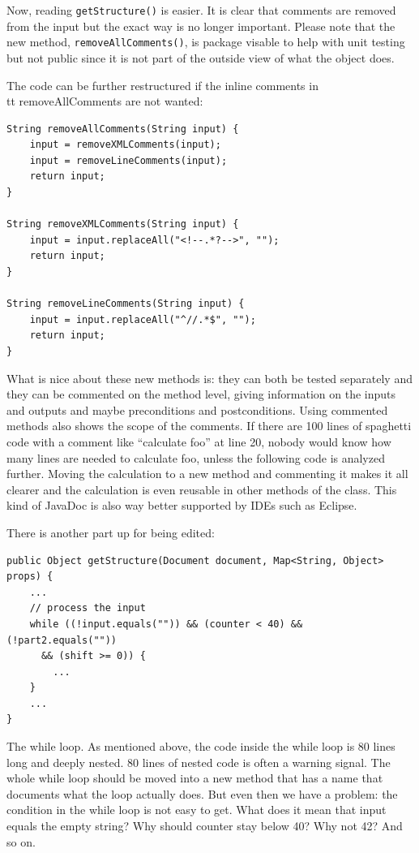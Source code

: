 \documentclass[12pt]{book}
\begin{document}
Now, reading {\tt getStructure()} is easier. It is clear that comments are removed from the input but the exact way is no longer important. Please note that the new method, {\tt removeAllComments()}, is package visable to help with unit testing but not public since it is not part of the outside view of what the object does. 

The code can be further restructured if the inline comments in {\\tt removeAllComments} are not wanted:

\begin{lstlisting}[caption=selfdoc3c.java] 
String removeAllComments(String input) {
    input = removeXMLComments(input);
    input = removeLineComments(input);
    return input;
}

String removeXMLComments(String input) {
    input = input.replaceAll("<!--.*?-->", "");
    return input;
}

String removeLineComments(String input) {
    input = input.replaceAll("^//.*$", "");
    return input;
}
\end{lstlisting}


What is nice about these new methods is: they can both be tested separately and they can be commented on the method level, giving information on the inputs and outputs and maybe preconditions and postconditions. Using commented methods also shows the scope of the comments. If there are 100 lines of spaghetti code with a comment like ``calculate foo'' at line 20, nobody would know how many lines are needed to calculate foo, unless the following code is analyzed further. Moving the calculation to a new method and commenting it makes it all clearer and the calculation is even reusable in other methods of the class. This kind of JavaDoc is also way better supported by IDEs such as Eclipse.

There is another part up for being edited:

\begin{lstlisting}[caption=selfdoc4a.java] 
public Object getStructure(Document document, Map<String, Object> props) {
    ...
    // process the input
    while ((!input.equals("")) && (counter < 40) && (!part2.equals("")) 
      && (shift >= 0)) {
        ...
    }
    ...
}
\end{lstlisting}

The while loop. As mentioned above, the code inside the while loop is 80 lines long and deeply nested. 80 lines of nested code is often a warning signal. The whole while loop should be moved into a new method that has a name that documents what the loop actually does. But even then we have a problem: the condition in the while loop is not easy to get. What does it mean that input equals the empty string?  Why should counter stay below 40? Why not 42? And so on. 
\end{document}
